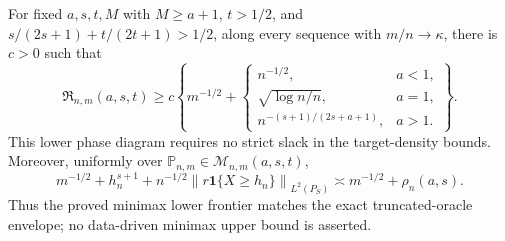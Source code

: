 For fixed \(a,s,t,M\) with \(M\ge a+1\), \(t>1/2\), and \(s/(2s+1)+t/(2t+1)>1/2\), along every sequence with \(m/n\to\kappa\), there is \(c>0\) such that
\[
\mathfrak R_{n,m}(a,s,t)\ge c\left\{m^{-1/2}+\begin{cases}
n^{-1/2},&a<1,\\
\sqrt{\log n/n},&a=1,\\
n^{-(s+1)/(2s+a+1)},&a>1.
\end{cases}\right\}.
\]
This lower phase diagram requires no strict slack in the target-density bounds. Moreover, uniformly over \(\mathbb P_{n,m}\in\mathcal M_{n,m}(a,s,t)\),
\[
m^{-1/2}+h_n^{s+1}+n^{-1/2}\left\|r\mathbf 1\{X\ge h_n\}\right\|_{L^2(P_S)}
\asymp m^{-1/2}+\rho_n(a,s).
\]
Thus the proved minimax lower frontier matches the exact truncated-oracle envelope; no data-driven minimax upper bound is asserted.